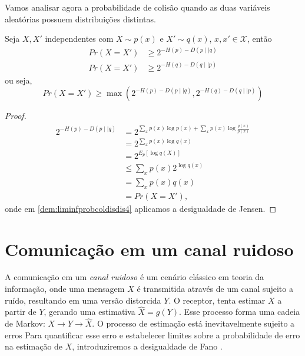 Vamos analisar agora a probabilidade de colisão quando as duas variáveis aleatórias possuem distribuições distintas.
\begin{corollary}
  Seja $X, X'$ independentes com $X \sim p(x)$ e $X' \sim q(x)$, $x,x' \in \mathcal{X}$, então
  \begin{subequations}
    \begin{align}
      Pr(X=X') &\geq 2^{-H(p) - D(p \mid\mid q)} \\
      Pr(X=X') &\geq 2^{-H(q) - D(q \mid\mid p)}
    \end{align}
  \end{subequations}
  ou seja,
  \begin{equation}
  Pr(X=X') \geq \max \left( 2^{-H(p) - D(p \mid\mid q)} , 2^{-H(q)-D(q \mid\mid p)} \right)
  \end{equation}
\end{corollary}
\begin{proof}
  \begin{subequations}\label{dem:liminfprobcoldisdis}
    \begin{align}
      2^{-H(p) - D(p \mid\mid q)} &= 2^{\sum_x p(x) \log p(x) + \sum_x p(x) \log \frac{q(x)}{p(x)}} \label{dem:liminfprobcoldisdis1}\\
                &= 2^{\sum_x p(x) \log q(x)} \label{dem:liminfprobcoldisdis2}\\
                &= 2^{E_p[\log q(X)]} \label{dem:liminfprobcoldisdis3} \\
                &\leq \sum_x p(x) 2^{\log q(x)}  \label{dem:liminfprobcoldisdis4} \\
                &= \sum_x p(x) q(x) \label{dem:liminfprobcoldisdis5} \\
                &= Pr(X=X') ,\label{dem:liminfprobcoldisdis6}
    \end{align}
  \end{subequations}
  onde em \ref{dem:liminfprobcoldisdis4} aplicamos a desigualdade de Jensen.
\end{proof}





\section{Comunicação em um canal ruidoso}
A comunicação em um \emph{canal ruidoso} é um cenário clássico em teoria da informação, onde uma mensagem
$X$ é transmitida através de um canal sujeito a ruído, resultando em uma versão distorcida $Y$.
O receptor, tenta estimar $X$ a partir de $Y$, gerando uma estimativa $\hat{X} = g(Y)$.
Esse processo forma uma cadeia de Markov: $X \rightarrow Y \rightarrow \hat{X}$.
O processo de estimação está inevitavelmente sujeito a erros Para quantificar esse erro e estabelecer
limites sobre a probabilidade de erro na estimação de $X$, introduziremos a desigualdade de Fano \parencite{fano1961}.

